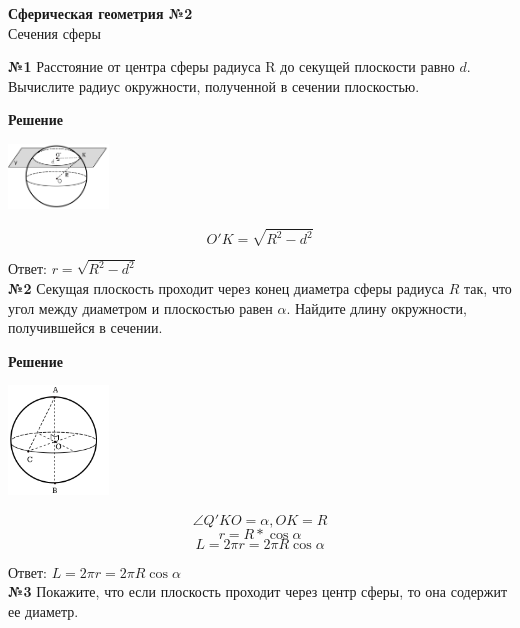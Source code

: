 


    \begin{center}
        \textbf{Сферическая геометрия №2}\\
        Сечения сферы
    \end{center}

    \textbf{№1} Расстояние от центра сферы радиуса R до секущей плоскости равно $d$.
    Вычислите радиус окружности, полученной в сечении плоскостью.

    \textbf{Решение}\\

    \begin{center}
        \includegraphics[width=0.2\textwidth]{images/img1}\\
    \end{center}

    \[  O'K =  \sqrt{R ^ 2 - d ^ 2} \]


    Ответ: $r = \sqrt{R ^ 2 - d ^ 2}$\\


    \textbf{№2} Секущая плоскость проходит через конец диаметра сферы радиуса $R$ так,
    что угол между диаметром и плоскостью равен $\alpha$.
    Найдите длину окружности, получившейся в сечении.

    \textbf{Решение}\\

    \begin{center}
        \includegraphics[width=0.2\textwidth]{images/img2}\\
    \end{center}

    \[\angle Q'KO = \alpha , OK = R\]
    \[ r = R * \cos \alpha \]
    \[ L = 2\pi r = 2 \pi R  \cos \alpha \]

    Ответ: $L = 2\pi r = 2 \pi R  \cos \alpha$\\


    \textbf{№3}
    Покажите, что если плоскость проходит через центр сферы, то она содержит ее диаметр.

